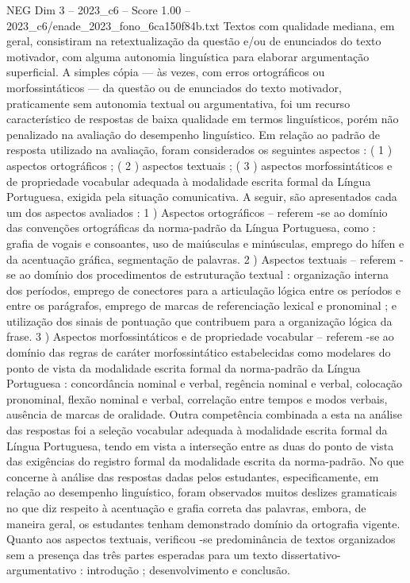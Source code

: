 \begin{textsample}{NEG Dim 3 – 2023\_c6 – Score 1.00 – 2023\_c6/enade\_2023\_fono\_6ca150f84b.txt}
Textos com qualidade mediana, em geral, consistiram na retextualização da questão e/ou de enunciados do texto motivador, com alguma autonomia linguística para elaborar argumentação superficial.
A simples cópia — às vezes, com erros ortográficos ou morfossintáticos — da questão ou de enunciados do texto motivador, praticamente sem autonomia textual ou argumentativa, foi um recurso característico de respostas de baixa qualidade em termos linguísticos, porém não penalizado na avaliação do desempenho linguístico.
Em relação ao padrão de resposta utilizado na avaliação, foram considerados os seguintes aspectos : ( 1 ) aspectos ortográficos ; ( 2 ) aspectos textuais ; ( 3 ) aspectos morfossintáticos e de propriedade vocabular adequada à modalidade escrita formal da Língua Portuguesa, exigida pela situação comunicativa.
A seguir, são apresentados cada um dos aspectos avaliados : 1 ) Aspectos ortográficos – referem -se ao domínio das convenções ortográficas da norma-padrão da Língua Portuguesa, como : grafia de vogais e consoantes, uso de maiúsculas e minúsculas, emprego do hífen e da acentuação gráfica, segmentação de palavras. 2 ) Aspectos textuais – referem -se ao domínio dos procedimentos de estruturação textual : organização interna dos períodos, emprego de conectores para a articulação lógica entre os períodos e entre os parágrafos, emprego de marcas de referenciação lexical e pronominal ; e utilização dos sinais de pontuação que contribuem para a organização lógica da frase. 3 ) Aspectos morfossintáticos e de propriedade vocabular – referem -se ao domínio das regras de caráter morfossintático estabelecidas como modelares do ponto de vista da modalidade escrita formal da norma-padrão da Língua Portuguesa : concordância nominal e verbal, regência nominal e verbal, colocação pronominal, flexão nominal e verbal, correlação entre tempos e modos verbais, ausência de marcas de oralidade.
Outra competência combinada a esta na análise das respostas foi a seleção vocabular adequada à modalidade escrita formal da Língua Portuguesa, tendo em vista a interseção entre as duas do ponto de vista das exigências do registro formal da modalidade escrita da norma-padrão.
No que concerne à análise das respostas dadas pelos estudantes, especificamente, em relação ao desempenho linguístico, foram observados muitos deslizes gramaticais no que diz respeito à acentuação e grafia correta das palavras, embora, de maneira geral, os estudantes tenham demonstrado domínio da ortografia vigente.
Quanto aos aspectos textuais, verificou -se predominância de textos organizados sem a presença das três partes esperadas para um texto dissertativo-argumentativo : introdução ; desenvolvimento e conclusão.

\end{textsample}
